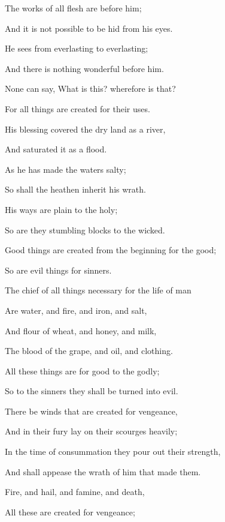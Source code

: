 {\par }{\Q {}The works of all flesh are before him;
\par }{\Q And it is not possible to be hid from his eyes.
\par }{\Q {}He sees from everlasting to everlasting;
\par }{\Q And there is nothing wonderful before him.
\par }{\Q {}None can say, What is this? wherefore is that?
\par }{\Q For all things are created for their uses.
\par }{\BB \par }{\Q {}His blessing covered the dry land as a river,
\par }{\Q And saturated it as a flood.
\par }{\Q {}As he has made the waters salty;
\par }{\Q So shall the heathen inherit his wrath.
\par }{\Q {}His ways are plain to the holy;
\par }{\Q So are they stumbling blocks to the wicked.
\par }{\Q {}Good things are created from the beginning for the good;
\par }{\Q So are evil things for sinners.
\par }{\Q {}The chief of all things necessary for the life of man
\par }{\Q Are water, and fire, and iron, and salt,
\par }{\Q And flour of wheat, and honey, and milk,
\par }{\Q The blood of the grape, and oil, and clothing.
\par }{\Q {}All these things are for good to the godly;
\par }{\Q So to the sinners they shall be turned into evil.
\par }{\BB \par }{\Q {}There be winds that are created for vengeance,
\par }{\Q And in their fury lay on their scourges heavily;
\par }{\Q In the time of consummation they pour out their strength,
\par }{\Q And shall appease the wrath of him that made them.
\par }{\Q {}Fire, and hail, and famine, and death,
\par }{\Q All these are created for vengeance;
}
